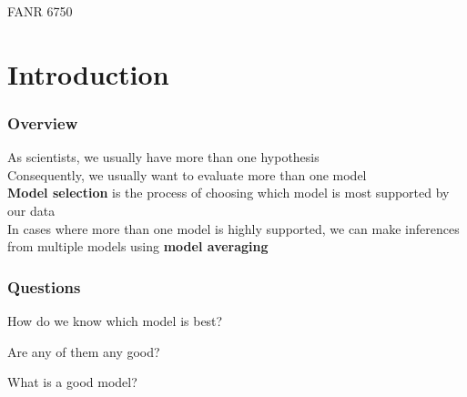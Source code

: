 \documentclass[color=usenames,dvipsnames]{beamer}\usepackage[]{graphicx}\usepackage[]{color}
\begin{document}



\begin{frame}[plain]
  \LARGE
  \centering \par
  {\color{NavyBlue}{ Model Selection and %
  Multimodel Inference \\}}
  \vspace{1cm}
  \large
  FANR 6750 \\
\end{frame}


\section{Introduction}






\begin{frame}
  \frametitle{Overview}
  As scientists, we usually have more than one hypothesis \\
  \pause
  \vfill
  Consequently, we usually want to evaluate more than one model \\
  \pause
  \vfill
  {\bf Model selection} is the process of choosing which model is most
  supported by our data \\
  \pause
  \vfill
  In cases where more than one model is highly supported, we can make
  inferences from multiple models using {\bf model averaging} \\
\end{frame}



\begin{frame}
  \frametitle{Questions}
  \large
  {How do we know which model is best? \par}
  \pause
  \vspace{0.9cm}
  { Are any of them any good? \par}
  \pause
  \vspace{0.9cm}
  {What is a good model? \par}
\end{frame}
\end{document}
